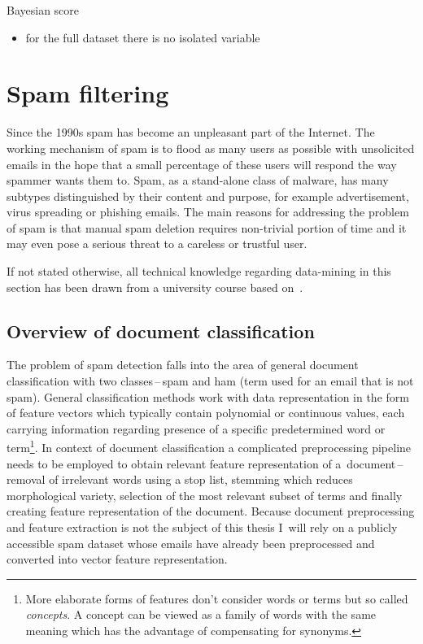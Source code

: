 \documentclass[english,cover]{fitthesis} %
\newcommand{\term}[1]{\emph{#1}}           %
\begin{document}
Bayesian score
\begin{itemize}
    \item for the full dataset there is no isolated variable
\end{itemize}


\section{Spam filtering}
Since the 1990s spam has become an unpleasant part of the Internet. The working mechanism of spam is to flood as many users as possible with unsolicited emails in the hope that a small percentage of these users will respond the way spammer wants them to. Spam, as a stand-alone class of malware, has many subtypes distinguished by their content and purpose, for example advertisement, virus spreading or phishing emails. The main reasons for addressing the problem of spam is that manual spam deletion requires non-trivial portion of time and it may even pose a serious threat to a careless or trustful user.

If not stated otherwise, all technical knowledge regarding data-mining in this section has been drawn from a university course based on~\cite{han_datamining}.

\subsection{Overview of document classification}
The problem of spam detection falls into the area of general document classification with two classes\,--\,spam and ham (term used for an email that is not spam). General classification methods work with data representation in the form of feature vectors which typically contain polynomial or continuous values, each carrying information regarding presence of a specific predetermined word or term\footnote{More elaborate forms of features don't consider words or terms but so called \term{concepts}. A concept can be viewed as a family of words with the same meaning which has the advantage of compensating for synonyms.}. In context of document classification a complicated preprocessing pipeline needs to be employed to obtain relevant feature representation of a~document\,--\,removal of irrelevant words using a stop list, stemming which reduces morphological variety, selection of the most relevant subset of terms and finally creating feature representation of the document. Because document preprocessing and feature extraction is not the subject of this thesis I~will rely on a publicly accessible spam dataset whose emails have already been preprocessed and converted into vector feature representation.
\end{document}
